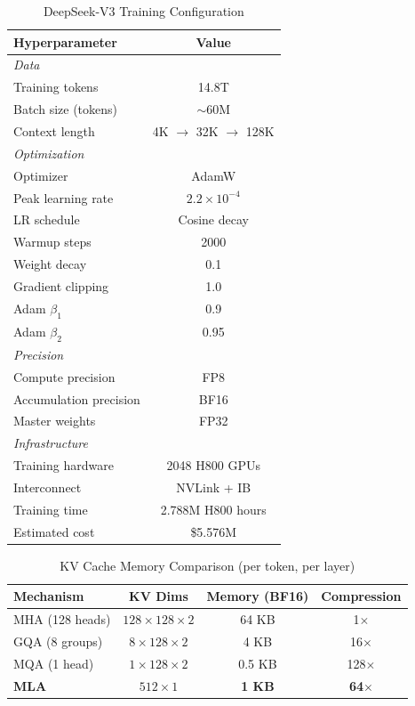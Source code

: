 \begin{table}[htbp]
\centering
\caption{DeepSeek-V3 Training Configuration}
\label{tab:training-config}
\begin{tabular}{@{}lc@{}}
\toprule
\textbf{Hyperparameter} & \textbf{Value} \\
\midrule
\multicolumn{2}{l}{\textit{Data}} \\
Training tokens & 14.8T \\
Batch size (tokens) & $\sim$60M \\
Context length & 4K $\rightarrow$ 32K $\rightarrow$ 128K \\
\midrule
\multicolumn{2}{l}{\textit{Optimization}} \\
Optimizer & AdamW \\
Peak learning rate & $2.2 \times 10^{-4}$ \\
LR schedule & Cosine decay \\
Warmup steps & 2000 \\
Weight decay & 0.1 \\
Gradient clipping & 1.0 \\
Adam $\beta_1$ & 0.9 \\
Adam $\beta_2$ & 0.95 \\
\midrule
\multicolumn{2}{l}{\textit{Precision}} \\
Compute precision & FP8 \\
Accumulation precision & BF16 \\
Master weights & FP32 \\
\midrule
\multicolumn{2}{l}{\textit{Infrastructure}} \\
Training hardware & 2048 H800 GPUs \\
Interconnect & NVLink + IB \\
Training time & 2.788M H800 hours \\
Estimated cost & \$5.576M \\
\bottomrule
\end{tabular}
\end{table}


\begin{table}[htbp]
\centering
\caption{KV Cache Memory Comparison (per token, per layer)}
\label{tab:kv-cache-comparison}
\begin{tabular}{@{}lccc@{}}
\toprule
\textbf{Mechanism} & \textbf{KV Dims} & \textbf{Memory (BF16)} & \textbf{Compression} \\
\midrule
MHA (128 heads) & $128 \times 128 \times 2$ & 64 KB & 1$\times$ \\
GQA (8 groups) & $8 \times 128 \times 2$ & 4 KB & 16$\times$ \\
MQA (1 head) & $1 \times 128 \times 2$ & 0.5 KB & 128$\times$ \\
\textbf{MLA} & $512 \times 1$ & \textbf{1 KB} & \textbf{64$\times$} \\
\bottomrule
\end{tabular}
\end{table}

